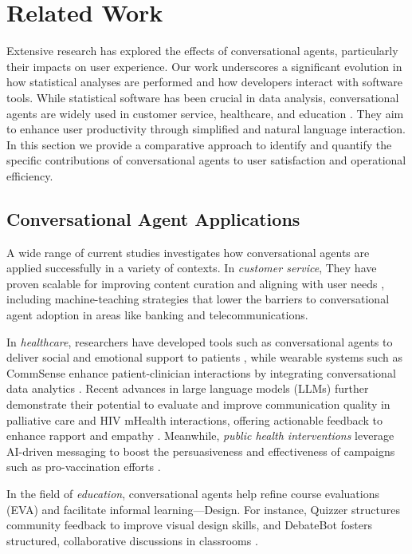 \documentclass{article}
\begin{document}
\section{Related Work}
Extensive research has explored the effects of conversational agents, particularly their impacts on user experience. Our work underscores a significant evolution in how statistical analyses are performed and how developers interact with software tools. While statistical software has been crucial in data analysis, conversational agents are widely used in customer service, healthcare, and education \cite{Folstad2017}. They aim to enhance user productivity through simplified and natural language interaction. In this section we provide a comparative approach to identify and quantify the specific contributions of conversational agents to user satisfaction and operational efficiency.
\subsection{Conversational Agent Applications}
A wide range of current studies investigates how conversational agents are applied successfully in a variety of contexts.\cite{catania2023conversational} In \textit{customer service}, They have proven scalable for improving content curation and aligning with user needs \citep{candello2022}, including machine-teaching strategies that lower the barriers to conversational agent adoption in areas like banking and telecommunications. 

In \textit{healthcare}, researchers have developed tools such as conversational agents to deliver social and emotional support to patients \citep{wang2021, he2023conversational}, while wearable systems such as CommSense enhance patient-clinician interactions by integrating conversational data analytics \cite{wang2024}. Recent advances in large language models (LLMs) further demonstrate their potential to evaluate and improve communication quality in palliative care and HIV mHealth interactions, offering actionable feedback to enhance rapport and empathy \citep{Wang2025, Wang2024chi}. Meanwhile, \textit{public health interventions} leverage AI-driven messaging to boost the persuasiveness and effectiveness of campaigns such as pro-vaccination efforts \cite{karinshak2023}. 

In the field of \textit{education}, conversational agents help refine course evaluations (EVA) and facilitate informal learning—Design. For instance, Quizzer \cite{schmitt2022} structures community feedback to improve visual design skills\cite{peng2024}, and DebateBot \cite{kim2021} fosters structured, collaborative discussions in classrooms \cite{wambsganss2022}. 
\end{document}
